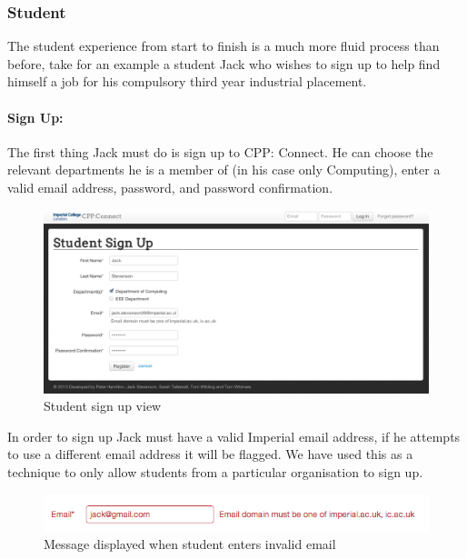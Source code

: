 \subsubsection{Student}
The student experience from start to finish is a much more fluid process than before, take for an example a student Jack who wishes to sign up to help find himself a job for his compulsory third year industrial placement.
  \paragraph{Sign Up:}
    The first thing Jack must do is sign up to CPP: Connect. He can choose the relevant departments he is a member of (in his case only Computing), enter a valid email address, password, and password confirmation.

    \begin{figure}[H]\centering
    \includegraphics[scale=0.3]{images/user_experiences/student/student_signup_filled_in}
    \caption{Student sign up view}
    \end{figure}

    In order to sign up Jack must have a valid Imperial email address, if he attempts to use a different email address it will be flagged. We have used this as a technique to only allow students from a particular organisation to sign up.

    \begin{figure}[H]\centering
    \includegraphics[scale=0.5]{images/user_experiences/student/invalid_email}
    \caption{Message displayed when student enters invalid email}
    \end{figure}

